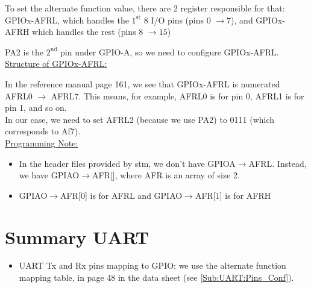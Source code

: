 \documentclass[12pt,a4paper]{book}
\begin{document}
To set the alternate function value, there are 2 register responsible for that: GPIOx-AFRL, which handles the $\mathrm{1}^\mathrm{st}$ 8 I/O pins (pins 0 $\rightarrow 7$), and GPIOx-AFRH which handles the rest (pins 8 $\rightarrow 15$)

PA2 is the $\mathrm{2}^\mathrm{nd}$ pin under GPIO-A, so we need to configure GPIOx-AFRL.\\

\underline{Structure of GPIOx-AFRL:}

In the reference manual page 161, we see that GPIOx-AFRL is numerated AFRL0 $\rightarrow$ AFRL7. This means, for example, AFRL0 is for pin 0, AFRL1 is for pin 1, and so on.\\

In our case, we need to set AFRL2 (because we use PA2) to 0111 (which corresponds to Af7).\\

\underline{Programming Note:}

    \begin{itemize}
    
    \item In the header files provided by stm, we don't have GPIOA$\rightarrow$AFRL. Instead, we have GPIAO$\rightarrow$AFR[], where AFR is an array of size 2. 

    \item  GPIAO$\rightarrow$AFR[0] is for AFRL and GPIAO$\rightarrow$AFR[1] is for AFRH
    
    \end{itemize}

\newpage
\section{Summary UART}

\begin{itemize}

\item UART Tx and Rx pins mapping to GPIO: we use the alternate function mapping table, in page 48 in the data sheet (see \ref{Sub:UART:Pins_Conf}).


\end{itemize}
\end{document}
